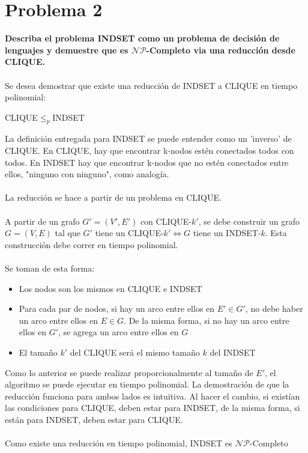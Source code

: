 \documentclass{article}
\def\NP{\mathcal{NP}}
\begin{document}
\section{Problema 2}
\textbf{Describa el problema INDSET como un problema de decisión de lenguajes y demuestre que es $\NP$-Completo via una reducción desde CLIQUE.}
\\\\
Se desea demostrar que existe una reducción de INDSET a CLIQUE en tiempo polinomial:
\begin{center}
	CLIQUE$\leq_{p}$INDSET
\end{center}

La definición entregada para INDSET se puede entender como un 'inverso' de CLIQUE. En CLIQUE, hay que encontrar k-nodos estén conectados todos con todos. En INDSET hay que encontrar k-nodos que no estén conectados entre ellos, "ninguno con ninguno", como analogía.
\\\\
La reducción se hace a partir de un problema en CLIQUE.
\\\\
A partir de un grafo $G'=(V',E')$ con CLIQUE-$k'$, se debe construir un grafo $G=(V,E)$ tal que $G'$ tiene un CLIQUE-$k' \iff G$ tiene un INDSET-$k$. Esta construcción debe correr en tiempo polinomial.
\\\\
Se toman de esta forma:
\begin{itemize}
	\item Los nodos son los mismos en CLIQUE e INDSET	
	\item Para cada par de nodos, si hay un arco entre ellos en $E' \in G'$, no debe haber un arco entre ellos en $E \in G$. De la misma forma, si no hay un arco entre ellos en $G'$, se agrega un arco entre ellos en $G$
	\item El tamaño $k'$ del CLIQUE será el mismo tamaño $k$ del INDSET
\end{itemize}
Como lo anterior se puede realizar proporcionalmente al tamaño de $E'$, el algoritmo se puede ejecutar en tiempo polinomial. La demostración de que la reducción funciona para ambos lados es intuitiva. Al hacer el cambio, si existían las condiciones para CLIQUE, deben estar para INDSET, de la misma forma, si están para INDSET, deben estar para CLIQUE. 
\\\\
Como existe una reducción en tiempo polinomial, INDSET es $\NP$-Completo
\end{document}
